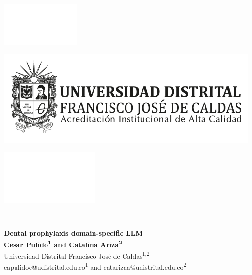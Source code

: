 \documentclass[a0,portrait]{a0poster}
\begin{document}
\begin{mdframed}[style=MyFrame]

\begin{minipage}[b]{0.33\linewidth}
\raggedright
\includegraphics[width=4cm,valign=t]{figures/minipage.png}
\end{minipage}
%
\begin{minipage}[b]{0.33\linewidth}
\centering
\includegraphics[width=20cm,valign=t]{figures/logo-ud.png}
\end{minipage}
% 
\begin{minipage}[b]{0.33\linewidth}
\raggedleft
\includegraphics[width=5cm,valign=t]{figures/minipage.png}
\end{minipage}\\

\vspace{3cm}
\begin{minipage}[h]{0.98\linewidth}
\centering \huge \color{SteelBlue} \textbf{Dental prophylaxis domain-specific LLM} \color{Black}\\ %
\Large \textbf{Cesar Pulido\textsuperscript{1} and Catalina Ariza\textsuperscript{2}}\\ %
\normalsize Universidad Distrital Francisco José de Caldas\textsuperscript{1,2}\\ %
capulidoc@udistrital.edu.co\textsuperscript{1} and catarizaa@udistrital.edu.co\textsuperscript{2}\\
\end{minipage}
\vspace{0.5cm} %


\end{mdframed}
\end{document}
